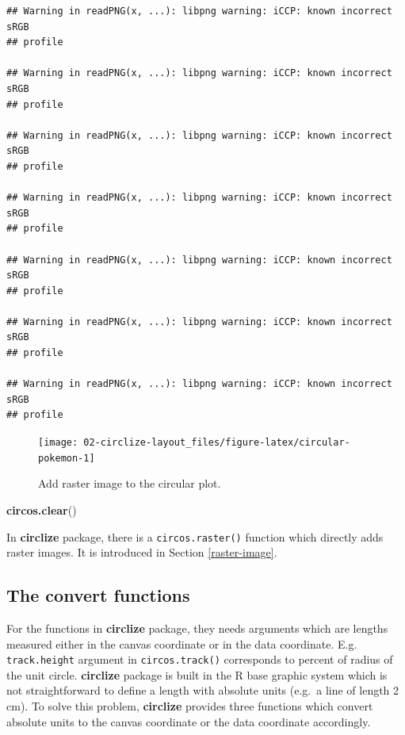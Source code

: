 \documentclass[]{book}
\newenvironment{Shaded}{\begin{snugshade}}{\end{snugshade}}
\newcommand{\KeywordTok}[1]{\textcolor[rgb]{0.13,0.29,0.53}{\textbf{#1}}}
\newcommand{\NormalTok}[1]{#1}
\begin{document}
\begin{verbatim}
## Warning in readPNG(x, ...): libpng warning: iCCP: known incorrect sRGB
## profile

## Warning in readPNG(x, ...): libpng warning: iCCP: known incorrect sRGB
## profile

## Warning in readPNG(x, ...): libpng warning: iCCP: known incorrect sRGB
## profile

## Warning in readPNG(x, ...): libpng warning: iCCP: known incorrect sRGB
## profile

## Warning in readPNG(x, ...): libpng warning: iCCP: known incorrect sRGB
## profile

## Warning in readPNG(x, ...): libpng warning: iCCP: known incorrect sRGB
## profile

## Warning in readPNG(x, ...): libpng warning: iCCP: known incorrect sRGB
## profile
\end{verbatim}

\begin{figure}

{\centering \texttt{[image: 02-circlize-layout\_files/figure-latex/circular-pokemon-1]} 

}

\caption{Add raster image to the circular plot.}\label{fig:circular-pokemon}
\end{figure}

\begin{Shaded}
\begin{Highlighting}[]
\KeywordTok{circos.clear}\NormalTok{()}
\end{Highlighting}
\end{Shaded}

In \textbf{circlize} package, there is a \texttt{circos.raster()}
function which directly adds raster images. It is introduced in Section
\ref{raster-image}.

\subsection{The convert functions}\label{convert-functions}

For the functions in \textbf{circlize} package, they needs arguments
which are lengths measured either in the canvas coordinate or in the
data coordinate. E.g. \texttt{track.height} argument in
\texttt{circos.track()} corresponds to percent of radius of the unit
circle. \textbf{circlize} package is built in the R base graphic system
which is not straightforward to define a length with absolute units
(e.g.~a line of length 2 cm). To solve this problem, \textbf{circlize}
provides three functions which convert absolute units to the canvas
coordinate or the data coordinate accordingly.
\end{document}
